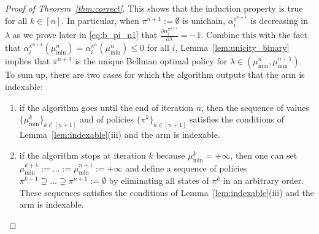 \begin{proof}[Proof of Theorem~\ref{thm:correct}]
    This shows that the induction property is true for all $k\in[n]$.
    In particular, when $\pi^{n+1}:=\emptyset$ is unichain, $\alpha^{\pi^{n+1}}_i$ is decreasing in $\lambda$ as we prove later in \eqref{eq:b_pi_n1} that $\frac{\partial \alpha^{\pi^{n+1}}_i}{\partial \lambda} =-1$.
    Combine this with the fact that $\alpha^{\pi^{n+1}}_i(\mu^{n}_{\min}) =\alpha^{\pi^{n}}_i(\mu^{n}_{\min})\le0$ for all $i$, Lemma~\ref{lem:unicity_binary} implies that $\pi^{n+1}$ is the unique Bellman optimal policy for $\lambda\in(\mu^n_{\min},\mu^{n+1}_{\min})$.
    To sum up, there are two cases for which the algorithm outputs that the arm is indexable:
    \begin{enumerate}
        \item if the algorithm goes until the end of iteration $n$, then the sequence of values $\{\mu^k_{\min}\}_{k\in[n+1]}$ and of policies $\{\pi^k\}_{k\in[n+1]}$ satisfies the conditions of Lemma~\ref{lem:indexable}(iii) and the arm is indexable.
        \item if the algorithm stops at iteration $k$ because $\mu^k_{\min}=+\infty$, then one can set $\mu^{k+1}_{\min}:=\dots:=\mu^{n+1}_{\min}:=+\infty$ and define a sequence of policies $\pi^{k+1}\supsetneq\dots\supsetneq\pi^{n+1}:=\emptyset$ by eliminating all states of $\pi^k$ in an arbitrary order. These sequences satisfies the conditions of Lemma~\ref{lem:indexable}(iii) and the arm is indexable.
    \end{enumerate}
    
    \medskip


\end{proof}
